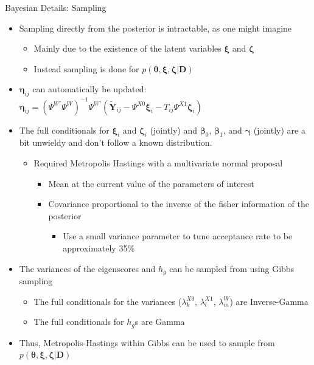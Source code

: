 \documentclass[
  ignorenonframetext,
]{beamer}
\providecommand{\tightlist}{%
  \setlength{\itemsep}{0pt}\setlength{\parskip}{0pt}}
\begin{document}
\begin{frame}{Bayesian Details: Sampling}
\protect\hypertarget{bayesian-details-sampling}{}
\begin{itemize}
\tightlist
\item
  Sampling directly from the posterior is intractable, as one might
  imagine

  \begin{itemize}
  \tightlist
  \item
    Mainly due to the existence of the latent variables
    \(\boldsymbol{\xi}\) and \(\boldsymbol{\zeta}\)
  \item
    Instead sampling is done for
    \(p(\boldsymbol{\theta}, \boldsymbol{\xi}, \boldsymbol{\zeta} | \boldsymbol{D})\)
  \end{itemize}
\item
  \(\boldsymbol{\eta}_{ij}\) can automatically be updated:
  \(\boldsymbol{\eta}_{ij} = (\Psi^{W'}\Psi^{W})^{-1}\Psi^{W'}(\tilde{\boldsymbol{Y}}_{ij} - \Psi^{X0}\boldsymbol{\xi}_i - T_{ij}\Psi^{X1}\boldsymbol{\zeta}_i)\)
\item
  The full conditionals for \(\boldsymbol{\xi}_i\) and
  \(\boldsymbol{\zeta}_i\) (jointly) and \(\boldsymbol{\beta}_0\),
  \(\boldsymbol{\beta}_1\), and \(\boldsymbol{\gamma}\) (jointly) are a
  bit unwieldy and don't follow a known distribution.

  \begin{itemize}
  \tightlist
  \item
    Required Metropolis Hastings with a multivariate normal proposal

    \begin{itemize}
    \tightlist
    \item
      Mean at the current value of the parameters of interest
    \item
      Covariance proportional to the inverse of the fisher information
      of the posterior

      \begin{itemize}
      \tightlist
      \item
        Use a small variance parameter to tune acceptance rate to be
        approximately 35\%
      \end{itemize}
    \end{itemize}
  \end{itemize}
\item
  The variances of the eigenscores and \(h_g\) can be sampled from using
  Gibbs sampling

  \begin{itemize}
  \tightlist
  \item
    The full conditionals for the variances (\(\lambda_k^{X0}\),
    \(\lambda_l^{X1}\), \(\lambda_m^{W}\)) are Inverse-Gamma
  \item
    The full conditionals for \(h_g\)s are Gamma
  \end{itemize}
\item
  Thus, Metropolis-Hastings within Gibbs can be used to sample from
  \(p(\boldsymbol{\theta}, \boldsymbol{\xi}, \boldsymbol{\zeta} | \boldsymbol{D})\)
\end{itemize}
\end{frame}
\end{document}
